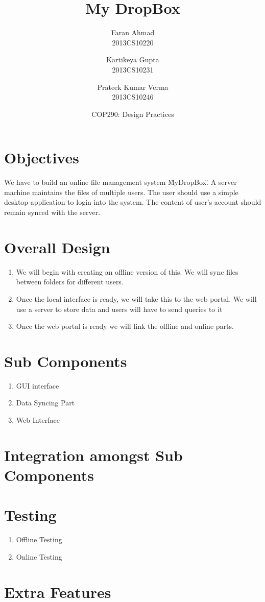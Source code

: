 \documentclass{article}
\title{\vspace*{\fill} My DropBox}
\author{
	Faran Ahmad\\
	2013CS10220
	\and
	Kartikeya Gupta\\ 
	2013CS10231
	\and
	Prateek Kumar Verma\\ 
	2013CS10246
}
\date{COP290: Design Practices \vspace*{\fill}}
\begin{document}
	\maketitle

	\newpage

	\section{Objectives}
	We have to build an online file management system \"MyDropBox\". A server machine maintains the files of multiple users. The user should use a simple desktop application to login into the system. The content of user's account should remain synced with the server. 

	\section{Overall Design}
		\begin{enumerate}
			\item We will begin with creating an offline version of this. We will sync files between folders for different users.
			\item Once the local interface is ready, we will take this to the web portal. We will use a server to store data and users will have to send queries to it
			\item Once the web portal is ready we will link the offline and online parts.

		\end{enumerate}
	\section{Sub Components}
		\begin{enumerate}
			\item GUI interface
			\item Data Syncing Part
			\item Web Interface 
		\end{enumerate}

	\section{Integration amongst Sub Components}

	\section{Testing}
		\begin{enumerate}
			\item Offline Testing
			\item Online Testing
		\end{enumerate}

	\section{Extra Features}
\end{document}
